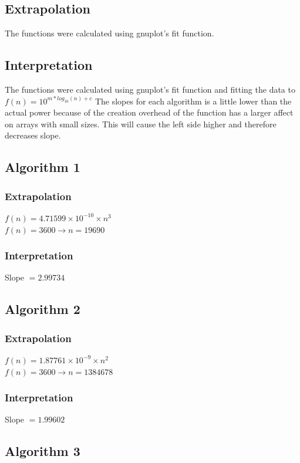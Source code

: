 \documentclass[a4paper,10pt]{article}
\begin{document}
		\subsection{Extrapolation}
			The functions were calculated using gnuplot's fit function.

		\subsection{Interpretation}
			The functions were calculated using gnuplot's fit function and fitting the data to $f(n) = 10^{m * log_{10}(n)+c}$
			The slopes for each algorithm is a little lower than the actual power because of the creation overhead of the function has a larger affect on arrays with small sizes.  This will cause the left side higher and therefore decreases slope.

		\subsection{Algorithm 1}
			\subsubsection{Extrapolation}
				$f(n) = 4.71599 \times 10^{-10} \times n^3$\\
				$f(n) = 3600 \to n = 19690$\\
			\subsubsection{Interpretation}
				Slope $= 2.99734$
		
		\subsection{Algorithm 2}
			\subsubsection{Extrapolation}
				$f(n) = 1.87761 \times 10^{-9} \times n^2$\\
				$f(n) = 3600 \to n = 1384678$
			\subsubsection{Interpretation}
				Slope $= 1.99602$

		\subsection{Algorithm 3}
\end{document}
